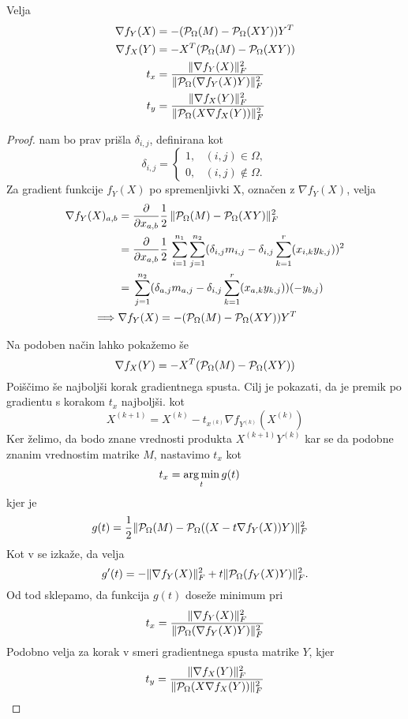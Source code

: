 \begin{theorem}
Velja
\begin{align*}
    \nabla f_Y(X) &= -(\mathcal{P}_\Omega(M) - \mathcal{P}_\Omega(XY))Y^T\\
    \nabla f_X(Y) &= -X^T (\mathcal{P}_\Omega(M) - \mathcal{P}_\Omega(XY))\\
    t_x &= \frac{\lVert\nabla f_Y(X)\rVert_F^2}{\lVert\mathcal{P}_\Omega(\nabla f_Y(X)Y)\rVert_F^2}  \\
    t_y &= \frac{\lVert\nabla f_X(Y)\rVert_F^2}{\lVert\mathcal{P}_\Omega(X \nabla f_X(Y))\rVert_F^2}  
\end{align*}
\end{theorem}

\begin{proof}
 nam bo prav prišla  $\delta_{i, j}$, definirana kot
\[
    \delta_{i,j} = 
    \left\{
    \begin{array}{rl}
        1,& (i, j) \in \Omega, \\
        0,& (i, j) \notin \Omega.
    \end{array}
    \right.
\]
Za gradient funkcije $f_Y(X)$ po spremenljivki X, označen z $\nabla f_Y(X)$, velja
\begin{align*}
    \nabla f_Y(X)_{a,b} &= \frac{\partial}{\partial x_{a,b}} \frac{1}{2}\, \lVert\mathcal{P}_\Omega(M) - \mathcal{P}_\Omega(XY)\rVert_F^2  \\
    &= \frac{\partial}{\partial x_{a,b}} \frac{1}{2}\, \sum_{i=1}^{n_1}\sum_{j=1}^{n_2}(\delta_{i,j}m_{i,j} - \delta_{i,j}\sum_{k=1}^{r}(x_{i,k}y_{k,j}))^2  \\
    &= \, \sum_{j=1}^{n_2}(\delta_{a,j}m_{a,j} - \delta_{i,j}\sum_{k=1}^{r}(x_{a,k}y_{k,j}))(-y_{b,j}) \\
    \implies &\nabla f_Y(X) = -(\mathcal{P}_\Omega(M) - \mathcal{P}_\Omega(XY))Y^T
\end{align*}

Na podoben način lahko pokažemo še
\[
    \nabla f_X(Y) = -X^T (\mathcal{P}_\Omega(M) - \mathcal{P}_\Omega(XY))
\]
Poiščimo še najboljši korak gradientnega spusta.
Cilj je pokazati, da je premik po gradientu s korakom $t_x$ najboljši.
 kot
\[
    X^{(k+1)} = X^{(k)} - t_{x^{(k)}} \nabla f_{Y^{(k)}}(X^{(k)})
\]
Ker želimo, da bodo znane vrednosti produkta $X^{(k+1)}Y^{(k)}$ kar se da podobne znanim vrednostim matrike $M$, nastavimo $t_x$ kot 
\begin{align*}
    t_x &= \operatorname*{arg\,min}_t g(t)
\end{align*} kjer je
\begin{align*}
    g(t) &= \frac{1}{2} \lVert\mathcal{P}_\Omega(M) - \mathcal{P}_\Omega((X - t\nabla f_Y(X))Y)\rVert_F^2
\end{align*}
Kot v \cite{AST-TK15} se izkaže, da velja
\[
  g'(t) = -\lVert\nabla f_Y(X)\rVert_F^2 + t\lVert\mathcal{P}_\Omega(f_Y(X)Y)\rVert_F^2. 
\]
Od tod sklepamo, da funkcija $g(t)$ doseže minimum pri 
\[
  t_x = \frac{\lVert\nabla f_Y(X)\rVert_F^2}{\lVert\mathcal{P}_\Omega(\nabla f_Y(X)Y)\rVert_F^2}  
\]
Podobno velja za korak v smeri gradientnega spusta matrike $Y$, kjer
\[
  t_y = \frac{\lVert\nabla f_X(Y)\rVert_F^2}{\lVert\mathcal{P}_\Omega(X \nabla f_X(Y))\rVert_F^2}  
\]

\end{proof}